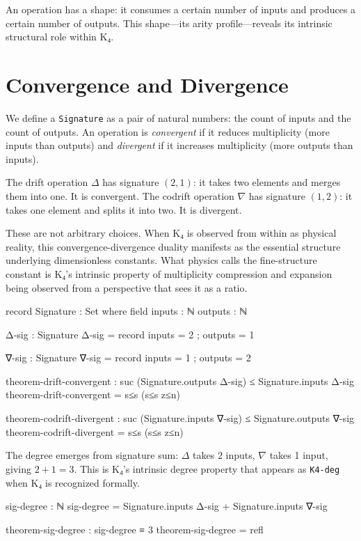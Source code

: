 \documentclass[11pt,a4paper]{book}
\begin{document}
An operation has a shape: it consumes a certain number of inputs and produces a 
certain number of outputs. This shape—its arity profile—reveals its intrinsic 
structural role within K₄.

\section{Convergence and Divergence}

We define a \texttt{Signature} as a pair of natural numbers: the count of inputs 
and the count of outputs. An operation is \emph{convergent} if it reduces multiplicity 
(more inputs than outputs) and \emph{divergent} if it increases multiplicity (more 
outputs than inputs).

The drift operation $\Delta$ has signature $(2,1)$: it takes two elements and merges 
them into one. It is convergent. The codrift operation $\nabla$ has signature $(1,2)$: 
it takes one element and splits it into two. It is divergent.

These are not arbitrary choices. When K₄ is observed from within as physical reality, 
this convergence-divergence duality manifests as the essential structure underlying 
dimensionless constants. What physics calls the fine-structure constant is K₄'s 
intrinsic property of multiplicity compression and expansion being observed from 
a perspective that sees it as a ratio.

\begin{code}
record Signature : Set where
  field
    inputs  : ℕ
    outputs : ℕ
\end{code}

\begin{code}
Δ-sig : Signature
Δ-sig = record { inputs = 2 ; outputs = 1 }

∇-sig : Signature
∇-sig = record { inputs = 1 ; outputs = 2 }

theorem-drift-convergent : suc (Signature.outputs Δ-sig) ≤ Signature.inputs Δ-sig
theorem-drift-convergent = s≤s (s≤s z≤n)

theorem-codrift-divergent : suc (Signature.inputs ∇-sig) ≤ Signature.outputs ∇-sig
theorem-codrift-divergent = s≤s (s≤s z≤n)
\end{code}

The degree emerges from signature sum: $\Delta$ takes 2 inputs, $\nabla$ takes 1 input, giving $2+1=3$.
This is K₄'s intrinsic degree property that appears as \texttt{K4-deg} when K₄ is recognized formally.

\begin{code}
sig-degree : ℕ
sig-degree = Signature.inputs Δ-sig + Signature.inputs ∇-sig

theorem-sig-degree : sig-degree ≡ 3
theorem-sig-degree = refl
\end{code}
\end{document}
